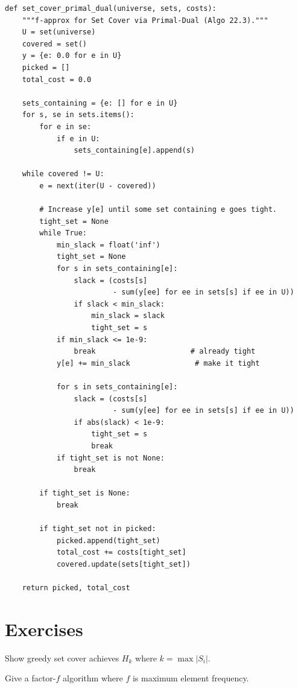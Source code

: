 \begin{lstlisting}[style=python, caption=Primal-Dual Set Cover (f-approx)]
def set_cover_primal_dual(universe, sets, costs):
    """f-approx for Set Cover via Primal-Dual (Algo 22.3)."""
    U = set(universe)
    covered = set()
    y = {e: 0.0 for e in U}
    picked = []
    total_cost = 0.0

    sets_containing = {e: [] for e in U}
    for s, se in sets.items():
        for e in se:
            if e in U:
                sets_containing[e].append(s)

    while covered != U:
        e = next(iter(U - covered))

        # Increase y[e] until some set containing e goes tight.
        tight_set = None
        while True:
            min_slack = float('inf')
            tight_set = None
            for s in sets_containing[e]:
                slack = (costs[s]
                         - sum(y[ee] for ee in sets[s] if ee in U))
                if slack < min_slack:
                    min_slack = slack
                    tight_set = s
            if min_slack <= 1e-9:
                break                      # already tight
            y[e] += min_slack               # make it tight

            for s in sets_containing[e]:
                slack = (costs[s]
                         - sum(y[ee] for ee in sets[s] if ee in U))
                if abs(slack) < 1e-9:
                    tight_set = s
                    break
            if tight_set is not None:
                break

        if tight_set is None:
            break

        if tight_set not in picked:
            picked.append(tight_set)
            total_cost += costs[tight_set]
            covered.update(sets[tight_set])

    return picked, total_cost
\end{lstlisting}

\section{Exercises}
\begin{exercise}
Show greedy set cover achieves $H_k$ where $k = \max |S_i|$.
\end{exercise}
\begin{exercise}
Give a factor-$f$ algorithm where $f$ is maximum element frequency.
\end{exercise}

